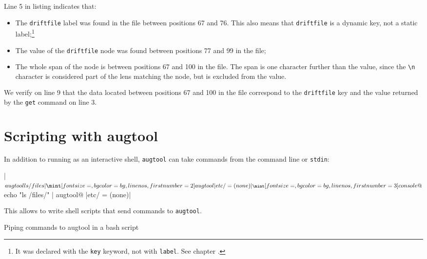 Line 5 in listing  indicates that:

\begin{itemize}
\item
  The \verb!driftfile! label was found in the file between positions 67 and 76. This also means that \verb!driftfile! is a dynamic key, not a static label;\footnote{It was declared with the \verb!key! keyword, not with \verb!label!. See chapter .}
\item
  The value of the \verb!driftfile! node was found between positions 77 and 99 in the file;
\item
  The whole span of the node is between positions 67 and 100 in the file. The span is one character further than the value, since the \verb!\n! character is considered part of the lens matching the node, but is excluded from the value.
\end{itemize}

We verify on line 9 that the data located between positions 67 and 100 in the file correspond to the \verb!driftfile! key and the value returned by the \verb!get! command on line 3.


\section{Scripting with augtool}


In addition to running as an interactive shell, \verb!augtool! can take commands from the command line or \verb!stdin!:

 

\consolecode[linenos]|$ augtool ls /files|
\augtoolcode[linenos,firstnumber=2]|etc/ = (none)|
\consolecode[linenos,firstnumber=3]@$ echo "ls /files/" | augtool@
\augtoolcode[linenos,firstnumber=4]|etc/ = (none)|

This allows to write shell scripts that send commands to \verb!augtool!.

  

\begin{listing}
  \caption{Piping commands to augtool in a bash script}
  \label{lst:augtool_wrap}
\end{listing}


